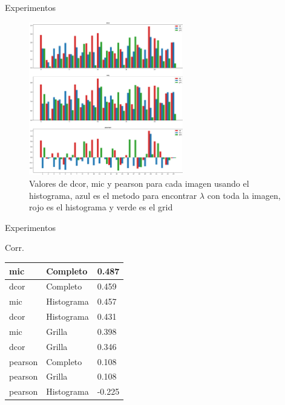 \documentclass{beamer}
\begin{document}
\begin{frame}{Experimentos}
    \begin{figure}[H]
        \centering
        \includegraphics[width=0.6\textwidth]{plot_comparison_hist.png}
        \caption{Valores de dcor, mic y pearson para cada imagen usando el histograma, azul es el metodo para encontrar $\lambda$ con toda la imagen, rojo es el histograma y verde es el grid}
    \end{figure}
\end{frame}

\begin{frame}{Experimentos}
    \begin{block}{Corr.} 
        \begin{table}[H]
            \centering
            \begin{tabular}{|l|l|l|}\hline
            mic     & Completo    & 0.487  \\\hline
            dcor    & Completo    & 0.459  \\
            mic     & Histograma  & 0.457  \\
            dcor    & Histograma  & 0.431  \\
            mic     & Grilla      & 0.398  \\
            dcor    & Grilla      & 0.346 \\
            pearson & Completo    & 0.108  \\
            pearson & Grilla      & 0.108  \\
            pearson & Histograma  & -0.225 \\\hline
            \end{tabular}
        \end{table}
    \end{block}
\end{frame}
\end{document}
